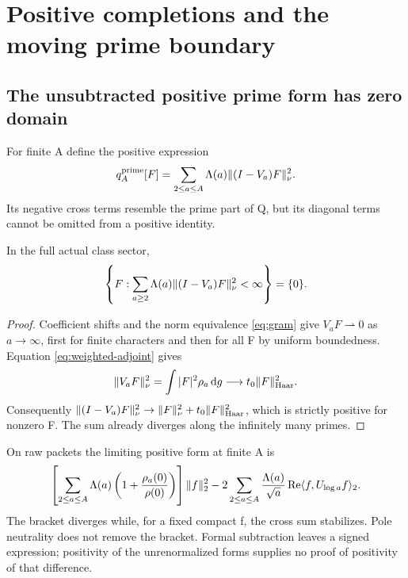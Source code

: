 \section{Positive completions and the moving prime boundary}\label{sec:positive}
\subsection{The unsubtracted positive prime form has zero domain}
For finite A define the positive expression
\begin{equation}
q_A^{\rm prime}[F]=
\sum_{2\le a\le A}\Lambda(a)\lVert (I-V_a)F\rVert_\nu^2 .
\end{equation}
Its negative cross terms resemble the prime part of Q, but its
diagonal terms cannot be omitted from a positive identity.

\begin{proposition}\label{prop:prime-zero-domain}
In the full actual class sector,
\begin{equation}
\left\{F:\sum_{a\ge2}\Lambda(a)\lVert (I-V_a)F\rVert_\nu^2<\infty\right\}
=\{0\}.
\end{equation}
\end{proposition}
\begin{proof}
Coefficient shifts and the norm equivalence \eqref{eq:gram}
give $V_aF\rightharpoonup0$ as $a\to\infty$, first for finite
characters and then for all F by uniform boundedness.
Equation \eqref{eq:weighted-adjoint} gives
\[
\lVert V_aF\rVert_\nu^2=\int|F|^2\rho_a\,\mathrm d g
\longrightarrow t_0\lVert F\rVert_{\rm Haar}^2 .
\]
Consequently
$\lVert (I-V_a)F\rVert_\nu^2\to
\lVert F\rVert_\nu^2+t_0\lVert F\rVert_{\rm Haar}^2$, which is strictly
positive for nonzero F. The sum already diverges along the
infinitely many primes.
\end{proof}
On raw packets the limiting positive form at finite A is
\begin{equation}
\left[\sum_{2\le a\le A}\Lambda(a)
       \left(1+\frac{\rho_a(0)}{\rho(0)}\right)\right]\lVert f\rVert_2^2
-2\sum_{2\le a\le A}\frac{\Lambda(a)}{\sqrt a}
                         \operatorname{Re}\langle f,U_{\log a}f\rangle_2.
\end{equation}
The bracket diverges while, for a fixed compact f, the cross
sum stabilizes. Pole neutrality does not remove the bracket.
Formal subtraction leaves a signed expression; positivity of
the unrenormalized forms supplies no proof of positivity of
that difference.

